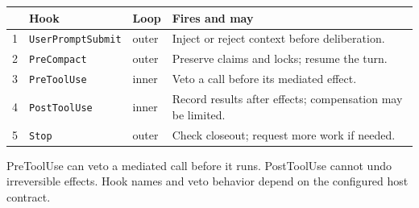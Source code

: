 \begin{minipage}{11.1cm}
\begin{tikzpicture}[pd figure,x=1cm,y=1cm]
\end{tikzpicture}
\par\smallskip
{\pdfiglabel\renewcommand{\arraystretch}{1.15}%
\begin{tabularx}{\linewidth}{@{}c p{2.55cm}p{.7cm}>{\raggedright\arraybackslash}X@{}}
\toprule
 & \textbf{Hook} & \textbf{Loop} & \textbf{Fires and may}\\
\midrule
1 & \texttt{UserPromptSubmit} & outer & Inject or reject context before deliberation.\\
2 & \texttt{PreCompact} & outer & Preserve claims and locks; resume the turn.\\
3 & \texttt{PreToolUse} & inner & Veto a call before its mediated effect.\\
4 & \texttt{PostToolUse} & inner & Record results after effects; compensation may be limited.\\
5 & \texttt{Stop} & outer & Check closeout; request more work if needed.\\
\bottomrule
\end{tabularx}}
\par\smallskip
{\pdfiglabelitalic\raggedright PreToolUse can veto a mediated call before it runs.
PostToolUse cannot undo irreversible effects. Hook names and veto behavior
depend on the configured host contract.\par}
\end{minipage}
